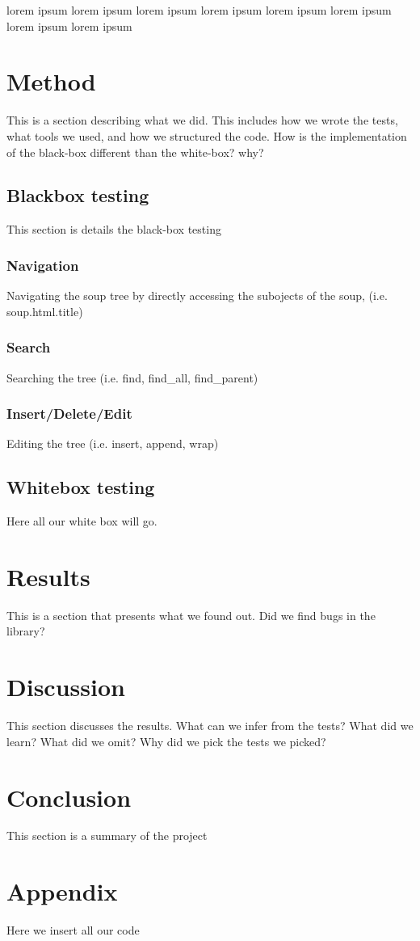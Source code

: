 \documentclass[10pt]{article}
\begin{document}
lorem ipsum lorem ipsum lorem ipsum lorem ipsum lorem ipsum lorem ipsum lorem ipsum lorem ipsum
\fi


\section{Method}
This is a section describing what we did.
This includes how we wrote the tests, what tools we used, and how we structured the code. 
How is the implementation of the black-box different than the white-box? why?


\subsection{Blackbox testing}
This section is details the black-box testing

\subsubsection{Navigation}
Navigating the soup tree by directly accessing the subojects of the soup, (i.e. soup.html.title)

\subsubsection{Search}
Searching the tree (i.e. find, find\_all, find\_parent)

\subsubsection{Insert/Delete/Edit}
Editing the tree (i.e. insert, append, wrap)

\subsection{Whitebox testing}
Here all our white box will go.

\section{Results}
This is a section that presents what we found out. Did we find bugs in the library?

\section{Discussion}
This section discusses the results. What can we infer from the tests? What did we learn? What did we omit? Why did we pick the tests we picked?


\section{Conclusion}
This section is a summary of the project

\section{Appendix}
Here we insert all our code
\end{document}
